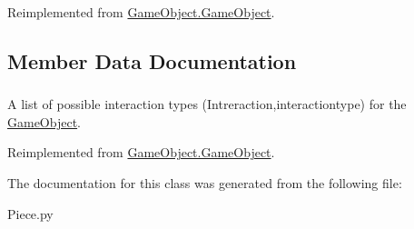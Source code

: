 \-Reimplemented from \hyperlink{classGameObject_1_1GameObject_a388f494ea5093578fa2a386b20eb9f4a}{\-Game\-Object.\-Game\-Object}.



\subsection{\-Member \-Data \-Documentation}
\hypertarget{classPiece_1_1Piece_ad2df134c76a4d099d2644bdaaac6473a}{
\subsubsection[{interactiondomain}]{}}\label{classPiece_1_1Piece_ad2df134c76a4d099d2644bdaaac6473a}


\-A list of possible interaction types (\-Intreraction,interactiontype) for the \hyperlink{namespaceGameObject}{\-Game\-Object}. 



\-Reimplemented from \hyperlink{classGameObject_1_1GameObject_a71b47fa67df2f55aa68c09fbfb4c2864}{\-Game\-Object.\-Game\-Object}.



\-The documentation for this class was generated from the following file\-:\begin{DoxyCompactItemize}
\item 
\-Piece.\-py\end{DoxyCompactItemize}
